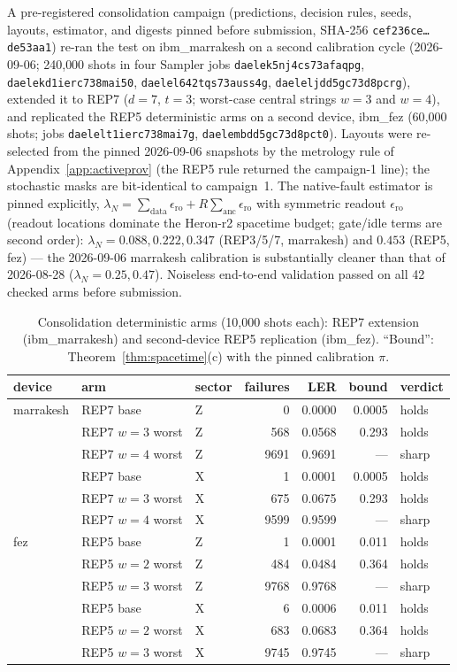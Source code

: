 \documentclass[11pt,a4paper]{article}
\begin{document}
A pre-registered consolidation campaign (predictions, decision rules,
seeds, layouts, estimator, and digests pinned before submission, SHA-256
\texttt{cef236ce\dots de53aa1}) re-ran the test on
ibm\_marrakesh on a second calibration cycle (2026-09-06; 240{,}000
shots in four Sampler jobs \texttt{daelek5nj4cs73afaqpg},
\texttt{daelekd1ierc738mai50}, \texttt{daelel642tqs73auss4g},
\texttt{daeleljdd5gc73d8pcrg}), extended it to REP7 ($d{=}7$, $t{=}3$;
worst-case central strings $w{=}3$ and $w{=}4$), and replicated the REP5
deterministic arms on a second device, ibm\_fez (60{,}000 shots; jobs
\texttt{daelelt1ierc738mai7g}, \texttt{daelembdd5gc73d8pct0}). Layouts
were re-selected from the pinned 2026-09-06 snapshots by the
metrology rule of Appendix~\ref{app:activeprov} (the REP5 rule returned
the campaign-1 line); the stochastic masks are bit-identical to
campaign~1. The native-fault estimator is pinned explicitly,
$\lambda_N=\sum_{\mathrm{data}}\epsilon_{\mathrm{ro}}+
R\sum_{\mathrm{anc}}\epsilon_{\mathrm{ro}}$ with symmetric readout
$\epsilon_{\mathrm{ro}}$ (readout locations dominate the Heron-r2
spacetime budget; gate/idle terms are second order): $\lambda_N{=}0.088,
0.222, 0.347$ (REP3/5/7, marrakesh) and $0.453$ (REP5, fez) --- the
2026-09-06 marrakesh calibration is substantially cleaner than that of
2026-08-28 ($\lambda_N{=}0.25, 0.47$). Noiseless end-to-end validation
passed on all 42 checked arms before submission.

\begin{table}[H]\centering\small
\caption{Consolidation deterministic arms (10{,}000 shots each): REP7
extension (ibm\_marrakesh) and second-device REP5 replication
(ibm\_fez). ``Bound'': Theorem~\ref{thm:spacetime}(c) with the pinned
calibration $\pi$.}
\label{tab:injrepl}
\begin{tabular}{@{}lllrrrl@{}}
\toprule
device & arm & sector & failures & LER & bound & verdict \\\midrule
marrakesh & REP7 base & Z & 0 & 0.0000 & 0.0005 & holds \\
 & REP7 $w{=}3$ worst & Z & 568 & 0.0568 & 0.293 & holds \\
 & REP7 $w{=}4$ worst & Z & 9691 & 0.9691 & --- & sharp \\
 & REP7 base & X & 1 & 0.0001 & 0.0005 & holds \\
 & REP7 $w{=}3$ worst & X & 675 & 0.0675 & 0.293 & holds \\
 & REP7 $w{=}4$ worst & X & 9599 & 0.9599 & --- & sharp \\\midrule
fez & REP5 base & Z & 1 & 0.0001 & 0.011 & holds \\
 & REP5 $w{=}2$ worst & Z & 484 & 0.0484 & 0.364 & holds \\
 & REP5 $w{=}3$ worst & Z & 9768 & 0.9768 & --- & sharp \\
 & REP5 base & X & 6 & 0.0006 & 0.011 & holds \\
 & REP5 $w{=}2$ worst & X & 683 & 0.0683 & 0.364 & holds \\
 & REP5 $w{=}3$ worst & X & 9745 & 0.9745 & --- & sharp \\\bottomrule
\end{tabular}
\end{table}
\end{document}

